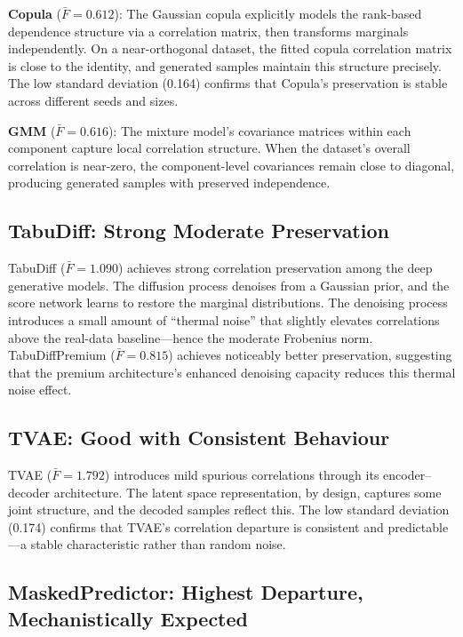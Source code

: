 \documentclass[11pt, a4paper]{report}
\begin{document}
\textbf{Copula} ($\bar{F} = 0.612$): The Gaussian copula explicitly models the rank-based dependence structure via a correlation matrix, then transforms marginals independently. On a near-orthogonal dataset, the fitted copula correlation matrix is close to the identity, and generated samples maintain this structure precisely. The low standard deviation (0.164) confirms that Copula's preservation is stable across different seeds and sizes.

\textbf{GMM} ($\bar{F} = 0.616$): The mixture model's covariance matrices within each component capture local correlation structure. When the dataset's overall correlation is near-zero, the component-level covariances remain close to diagonal, producing generated samples with preserved independence.

\subsection{TabuDiff: Strong Moderate Preservation}

TabuDiff ($\bar{F} = 1.090$) achieves strong correlation preservation among the deep generative models. The diffusion process denoises from a Gaussian prior, and the score network learns to restore the marginal distributions. The denoising process introduces a small amount of ``thermal noise'' that slightly elevates correlations above the real-data baseline---hence the moderate Frobenius norm. TabuDiffPremium ($\bar{F} = 0.815$) achieves noticeably better preservation, suggesting that the premium architecture's enhanced denoising capacity reduces this thermal noise effect.

\subsection{TVAE: Good with Consistent Behaviour}

TVAE ($\bar{F} = 1.792$) introduces mild spurious correlations through its encoder--decoder architecture. The latent space representation, by design, captures some joint structure, and the decoded samples reflect this. The low standard deviation (0.174) confirms that TVAE's correlation departure is consistent and predictable---a stable characteristic rather than random noise.

\subsection{MaskedPredictor: Highest Departure, Mechanistically Expected}
\end{document}
